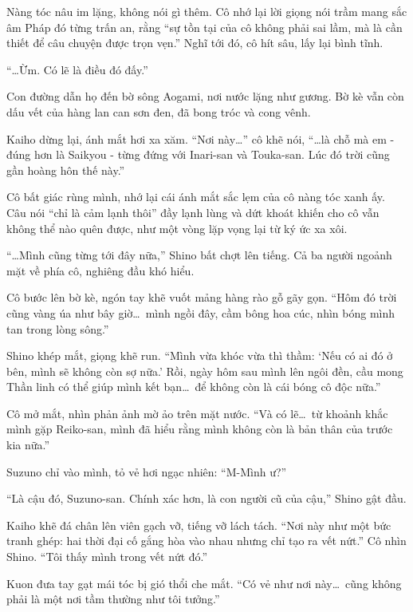 \documentclass[../main.tex]{subfiles}
\begin{document}
Nàng tóc nâu im lặng, không nói gì thêm. Cô nhớ lại lời giọng nói trầm mang sắc âm Pháp đó từng trấn an, rằng ``sự tồn tại của cô không phải sai lầm, mà là cần thiết để câu chuyện được trọn vẹn.'' Nghĩ tới đó, cô hít sâu, lấy lại bình tĩnh.

``\dots Ừm. Có lẽ là điều đó đấy.''

\ct

Con đường dẫn họ đến bờ sông Aogami, nơi nước lặng như gương. Bờ kè vẫn còn dấu vết của hàng lan can sơn đen, đã bong tróc và cong vênh.


Kaiho dừng lại, ánh mắt hơi xa xăm.
``Nơi này\dots'' cô khẽ nói, ``\dots là chỗ mà em - đúng hơn là Saikyou - từng đứng với Inari-san và Touka-san. Lúc đó trời cũng gần hoàng hôn thế này.''

Cô bất giác rùng mình, nhớ lại cái ánh mắt sắc lẹm của cô nàng tóc xanh ấy. Câu nói ``chỉ là cảm lạnh thôi'' đầy lạnh lùng và dứt khoát khiến cho cô vẫn không thể nào quên được, như một vòng lặp vọng lại từ ký ức xa xôi.

``\dots Mình cũng từng tới đây nữa,'' Shino bất chợt lên tiếng. Cả ba người ngoảnh mặt về phía cô, nghiêng đầu khó hiểu.

Cô bước lên bờ kè, ngón tay khẽ vuốt mảng hàng rào gỗ gãy gọn. ``Hôm đó trời cũng vàng úa như bây giờ\dots\ mình ngồi đây, cầm bông hoa cúc, nhìn bóng mình tan trong lòng sông.''

Shino khép mắt, giọng khẽ run. ``Mình vừa khóc vừa thì thầm: `Nếu có ai đó ở bên, mình sẽ không còn sợ nữa.' Rồi, ngày hôm sau mình lên ngôi đền, cầu mong Thần linh có thể giúp mình kết bạn\dots\ để không còn là cái bóng cô độc nữa.''

Cô mở mắt, nhìn phản ảnh mờ ảo trên mặt nước. ``Và có lẽ\dots\ từ khoảnh khắc mình gặp Reiko-san, mình đã hiểu rằng mình không còn là bản thân của trước kia nữa.''

Suzuno chỉ vào mình, tỏ vẻ hơi ngạc nhiên: ``M-Mình ư?''

``Là cậu đó, Suzuno-san. Chính xác hơn, là con người cũ của cậu,'' Shino gật đầu.

Kaiho khẽ đá chân lên viên gạch vỡ, tiếng vỡ lách tách. ``Nơi này như một bức tranh ghép: hai thời đại cố gắng hòa vào nhau nhưng chỉ tạo ra vết nứt.'' Cô nhìn Shino. ``Tôi thấy mình trong vết nứt đó.''

Kuon đưa tay gạt mái tóc bị gió thổi che mắt. ``Có vẻ như nơi này\dots\ cũng không phải là một nơi tầm thường như tôi tưởng.''
\end{document}
